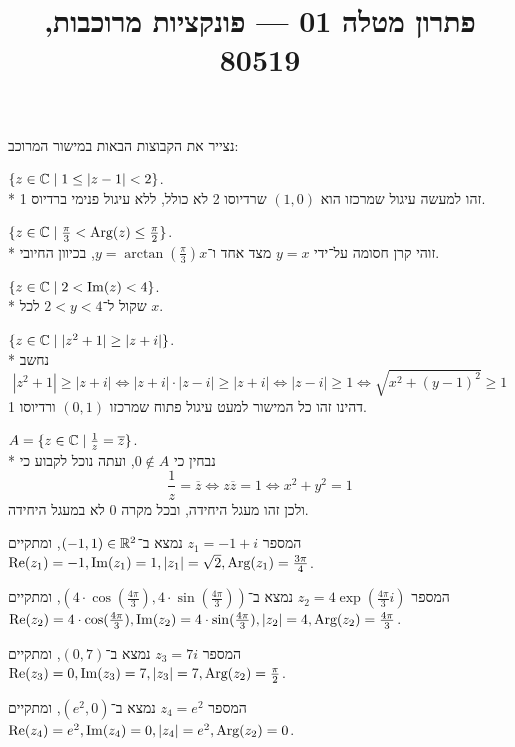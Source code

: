 
\title{פתרון מטלה 01 --- פונקציות מרוכבות, 80519}


\maketitle
\maketitleprint{}

\Question{}
נצייר את הקבוצות הבאות במישור המרוכב:

\Subquestion{}
$\{z \in \mathbb{C} \mid 1 \le |z - 1| < 2\}$. \\*
זהו למעשה עיגול שמרכזו הוא $(1, 0)$ שרדיוסו 2 לא כולל, ללא עיגול פנימי ברדיוס 1.

\Subquestion{}
$\{z \in \mathbb{C} \mid \frac{\pi}{3} < \text{Arg}(z) \le \frac{\pi}{2} \}$. \\*
זוהי קרן חסומה על־ידי $y = x$ מצד אחד ו־$y = \arctan(\frac{\pi}{3})x$, בכיוון החיובי.

\Subquestion{}
$\{ z \in \mathbb{C} \mid 2 < \operatorname{Im}(z) < 4 \}$. \\*
שקול ל־$2 < y < 4$ לכל $x$.

\Subquestion{}
$\{ z \in \mathbb{C} \mid |z^2 + 1| \ge |z + i| \}$. \\*
נחשב
\[
	|z^2 + 1| \ge |z + i|
	\iff |z + i| \cdot |z - i| \ge |z + i|
	\iff |z - i| \ge 1
	\iff \sqrt{x^2 + {(y - 1)}^2} \ge 1
\]
דהינו זהו כל המישור למעט עיגול פתוח שמרכזו $(0, 1)$ ורדיוסו 1.

\Subquestion{}
$A = \{z \in \mathbb{C} \mid \frac{1}{z} = \overline{z}\}$. \\*
נבחין כי $0 \notin A$, ועתה נוכל לקבוע כי
\[
	\frac{1}{z} = \overline{z}
	\iff z \overline{z} = 1
	\iff x^2 + y^2 = 1
\]
ולכן זהו מעגל היחידה, ובכל מקרה $0$ לא במעגל היחידה.

\Question{}
\Subquestion{}
המספר $z_1 = -1 + i$ נמצא ב־$(-1, 1) \in \mathbb{R}^2$, ומתקיים $\operatorname{Re}(z_1) = -1, \operatorname{Im}(z_1) = 1, |z_1| = \sqrt{2}, \text{Arg}(z_1) = \frac{3\pi}{4}$.

\Subquestion{}
המספר $z_2 = 4 \exp(\frac{4\pi}{3} i)$ נמצא ב־$(4 \cdot \cos(\frac{4\pi}{3}), 4 \cdot \sin(\frac{4\pi}{3}))$,
ומתקיים $\operatorname{Re}(z_2) = 4 \cdot \cos(\frac{4\pi}{3}), \operatorname{Im}(z_2) = 4 \cdot \sin(\frac{4\pi}{3}), |z_2| = 4, \text{Arg}(z_2) = \frac{4\pi}{3}$.

\Subquestion{}
המספר $z_3 = 7i$ נמצא ב־$(0, 7)$,
ומתקיים $\operatorname{Re}(z_3) = 0, \operatorname{Im}(z_3) = 7, |z_3| = 7, \text{Arg}(z_2) = \frac{\pi}{2}$.

\Subquestion{}
המספר $z_4 = e^2$ נמצא ב־$(e^2, 0)$,
ומתקיים $\operatorname{Re}(z_4) = e^2, \operatorname{Im}(z_4) = 0, |z_4| = e^2, \text{Arg}(z_2) = 0$.


